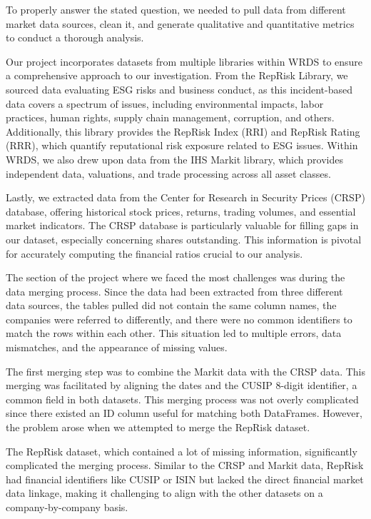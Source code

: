 To properly answer the stated question, we needed to pull data from different market data sources, clean it, and generate qualitative and quantitative metrics to conduct a thorough analysis.

Our project incorporates datasets from multiple libraries within WRDS to ensure a comprehensive approach to our investigation. From the RepRisk Library, we sourced data evaluating ESG risks and business conduct, as this incident-based data covers a spectrum of issues, including environmental impacts, labor practices, human rights, supply chain management, corruption, and others. Additionally, this library provides the RepRisk Index (RRI) and RepRisk Rating (RRR), which quantify reputational risk exposure related to ESG issues. Within WRDS, we also drew upon data from the IHS Markit library, which provides independent data, valuations, and trade processing across all asset classes.

Lastly, we extracted data from the Center for Research in Security Prices (CRSP) database, offering historical stock prices, returns, trading volumes, and essential market indicators. The CRSP database is particularly valuable for filling gaps in our dataset, especially concerning shares outstanding. This information is pivotal for accurately computing the financial ratios crucial to our analysis.

The section of the project where we faced the most challenges was during the data merging process. Since the data had been extracted from three different data sources, the tables pulled did not contain the same column names, the companies were referred to differently, and there were no common identifiers to match the rows within each other. This situation led to multiple errors, data mismatches, and the appearance of missing values.

The first merging step was to combine the Markit data with the CRSP data. This merging was facilitated by aligning the dates and the CUSIP 8-digit identifier, a common field in both datasets. This merging process was not overly complicated since there existed an ID column useful for matching both DataFrames. However, the problem arose when we attempted to merge the RepRisk dataset.

The RepRisk dataset, which contained a lot of missing information, significantly complicated the merging process. Similar to the CRSP and Markit data, RepRisk had financial identifiers like CUSIP or ISIN but lacked the direct financial market data linkage, making it challenging to align with the other datasets on a company-by-company basis.

